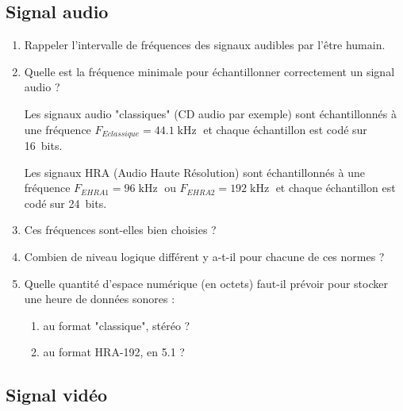 \enteteThematiqueObligatoire{}


\subsection*{Signal audio}

\begin{enumerate}
	\item Rappeler l'intervalle de fréquences des signaux audibles par l'être humain.
	\item Quelle est la fréquence minimale pour échantillonner correctement un signal audio ?

Les signaux audio "classiques" (CD audio par exemple) sont échantillonnés à une fréquence $F_{Eclassique} = 44.1\operatorname{kHz}$ et chaque échantillon est codé sur 16~bits. 

Les signaux HRA (Audio Haute Résolution) sont échantillonnés à une fréquence $F_{EHRA1} = 96\operatorname{kHz}$ ou $F_{EHRA2} = 192\operatorname{kHz}$ et chaque échantillon est codé sur 24~bits.

	\item Ces fréquences sont-elles bien choisies ?
	\item Combien de niveau logique différent y a-t-il pour chacune de ces normes ?

	\item Quelle quantité d'espace numérique (en octets) faut-il prévoir pour stocker une heure de données sonores :
	\begin{enumerate}
		\item au format "classique", stéréo ?
		\item au format HRA-192, en 5.1 ?
	\end{enumerate}
\end{enumerate}

\subsection*{Signal vidéo}

